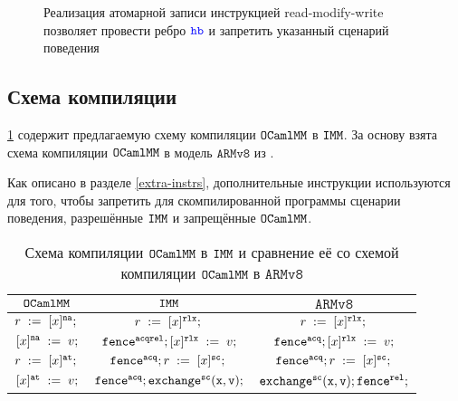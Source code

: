 \newcommand{\offsetthree}{6}
\begin{figure}[h]
  \centering
  \begin{minipage}{0.9\textwidth}
    \centering
  \end{minipage}
  \caption{Реализация атомарной записи инструкцией read-modify-write позволяет провести ребро $\lHB$ и запретить указанный сценарий поведения}
  \label{fig:rmw-hb}
\end{figure}



\subsection{Схема компиляции}

\cref{table:scheme} содержит предлагаемую схему компиляции $\mathtt{OCaml}\allowbreak \mathtt{MM}$ в $\mathtt{IMM}$. За основу взята схема компиляции $\mathtt{OCaml}\allowbreak \mathtt{MM}$ в модель $\mathtt{ARMv8}$ из \cite{omm}.

Как описано в разделе \ref{extra-instrs}, дополнительные инструкции используются для того, чтобы запретить для скомпилированной программы сценарии поведения, разрешённые $\mathtt{IMM}$ и запрещённые $\mathtt{OCaml}\allowbreak \mathtt{MM}$. 

\begin{table}[h]
  \centering
  \begin{tabular}{ | c | c | c| }
    \hline
    $\mathtt{OCaml}\allowbreak \mathtt{MM}$ & $\mathtt{IMM}$ & $\mathtt{ARMv8}$ \\
    \hline
    $\readInst{r}{x}{}{\na}$ & $\readInst{r}{x}{}{\rlx}$ & $\readInst{r}{x}{}{\rlx}$  \\
    $[x]^{{\mathtt{na}}}\;:=\;v;$ & $\mathtt{fence}^{{\mathtt{acqrel}}}; [x]^{\mathtt{rlx}}\;:=\;v;$ & $\mathtt{fence}^{{\mathtt{acq}}};  [x]^{\mathtt{rlx}}\;:=\;v;$\\
    $\readInst{r}{x}{}{\at}$ & $\fenceInst{\acq} \readInst{r}{x}{}{\sco}$ & $\fenceInst{\acq} \readInst{r}{x}{}{\sco}$\\
    $[x]^{{\mathtt{at}}}\;:=\;v;$ & $\mathtt{fence}^{{\mathtt{acq}}}; \mathtt{exchange^{{\mathtt{sc}}}(x, v)};$ & $\mathtt{exchange^{{\mathtt{sc}}}(x, v)}; \mathtt{fence}^{{\mathtt{rel}}};$\\
    \hline
  \end{tabular}
  \caption{Схема компиляции $\mathtt{OCaml}\allowbreak \mathtt{MM}$ в $\mathtt{IMM}$ и сравнение её со схемой компиляции $\mathtt{OCaml}\allowbreak \mathtt{MM}$ в $\mathtt{ARMv8}$}
  \label{table:scheme}
\end{table}


